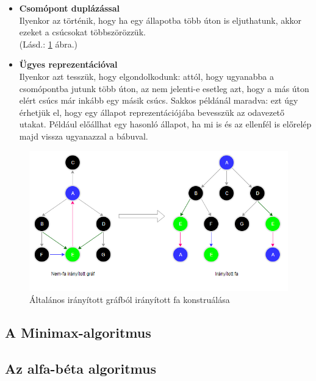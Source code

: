 \documentclass[twoside, a4paper, 12pt]{article}
\begin{document}
\begin{itemize}
	\item \textbf{Csomópont duplázással} \\
	Ilyenkor az történik, hogy ha egy állapotba több úton is eljuthatunk, akkor ezeket a csúcsokat többszörözzük. \\
	(Lásd.: \ref{fig:game-graph-transformation} ábra.)

	\item \textbf{Ügyes reprezentációval} \\
	Ilyenkor azt tesszük, hogy elgondolkodunk: attól, hogy ugyanabba a csomópontba jutunk több úton, az nem jelenti-e esetleg azt, hogy a más úton elért csúcs már inkább egy másik csúcs. Sakkos példánál maradva: ezt úgy érhetjük el, hogy egy állapot reprezentációjába bevesszük az odavezető utakat. Például előállhat egy hasonló állapot, ha mi is és az ellenfél is előrelép majd vissza ugyanazzal a bábuval.
\end{itemize}

\begin{figure}[htbp]
	\centering
	\includegraphics[width=1.0\textwidth]{img/game-graph-transformation.png}
	\caption{Általános irányított gráfból irányított fa konstruálása}
	\label{fig:game-graph-transformation}
\end{figure}

\subsection{A Minimax-algoritmus}
\lipsum[1]

\subsection{Az alfa-béta algoritmus}
\lipsum[2]
\end{document}
